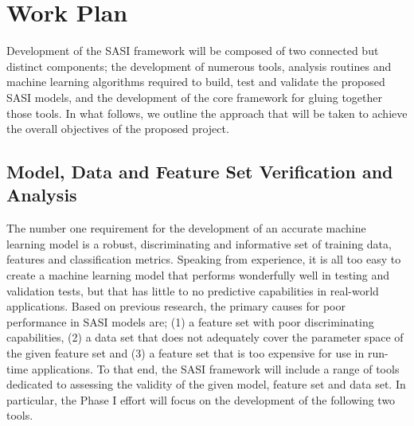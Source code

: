 \section{Work Plan} 
\label{sec:approach}


Development of the SASI framework will be composed of two connected but distinct components; the development of numerous tools, analysis routines and machine learning algorithms required to build, test and validate  the proposed SASI models, and the development of the core framework for gluing together those tools. In what follows, we outline the approach that will be taken to achieve the overall objectives of the proposed project. 

\subsection{ Model, Data and Feature Set Verification and Analysis }
\label{sec:modelvar}
The number one requirement for the development of an accurate machine learning model is a robust, discriminating and informative set of training data, features and classification metrics. Speaking from experience, it is all too easy to create a machine learning model that performs wonderfully well in testing and validation tests, but that has little to no predictive capabilities in real-world applications. Based on previous research, the primary causes for poor performance in SASI models are; (1) a feature set with poor discriminating capabilities, (2) a data set that does not adequately cover the parameter space of the given feature set and (3) a feature set that is too expensive for use in run-time applications. To that end, the SASI framework will include a range of tools dedicated to assessing the validity of the given model, feature set and data set. In particular, the Phase I effort will focus on the development of the following two tools.

